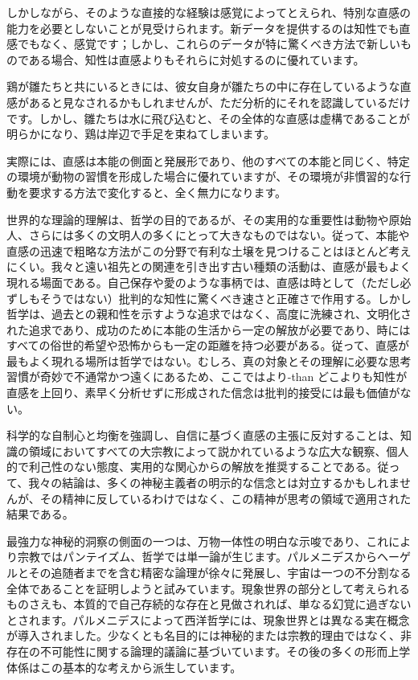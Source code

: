\documentclass[a4paper,11pt,openany]{ltjsbook}
\begin{document}
しかしながら、そのような直接的な経験は感覚によってとえられ、特別な直感の能力を必要としないことが見受けられます。新データを提供するのは知性でも直感でもなく、感覚です；しかし、これらのデータが特に驚くべき方法で新しいものである場合、知性は直感よりもそれらに対処するのに優れています。

鶏が雛たちと共にいるときには、彼女自身が雛たちの中に存在しているような直感があると見なされるかもしれませんが、ただ分析的にそれを認識しているだけです。しかし、雛たちは水に飛び込むと、その全体的な直感は虚構であることが明らかになり、鶏は岸辺で手足を束ねてしまいます。

実際には、直感は本能の側面と発展形であり、他のすべての本能と同じく、特定の環境が動物の習慣を形成した場合に優れていますが、その環境が非慣習的な行動を要求する方法で変化すると、全く無力になります。

世界的な理論的理解は、哲学の目的であるが、その実用的な重要性は動物や原始人、さらには多くの文明人の多くにとって大きなものではない。従って、本能や直感の迅速で粗略な方法がこの分野で有利な土壌を見つけることはほとんど考えにくい。我々と遠い祖先との関連を引き出す古い種類の活動は、直感が最もよく現れる場面である。自己保存や愛のような事柄では、直感は時として（ただし必ずしもそうではない）批判的な知性に驚くべき速さと正確さで作用する。しかし哲学は、過去との親和性を示すような追求ではなく、高度に洗練され、文明化された追求であり、成功のために本能の生活から一定の解放が必要であり、時にはすべての俗世的希望や恐怖からも一定の距離を持つ必要がある。従って、直感が最もよく現れる場所は哲学ではない。むしろ、真の対象とその理解に必要な思考習慣が奇妙で不通常かつ遠くにあるため、ここではより-than どこよりも知性が直感を上回り、素早く分析せずに形成された信念は批判的接受には最も価値がない。

科学的な自制心と均衡を強調し、自信に基づく直感の主張に反対することは、知識の領域においてすべての大宗教によって説かれているような広大な観察、個人的で利己性のない態度、実用的な関心からの解放を推奨することである。従って、我々の結論は、多くの神秘主義者の明示的な信念とは対立するかもしれませんが、その精神に反しているわけではなく、この精神が思考の領域で適用された結果である。


最強力な神秘的洞察の側面の一つは、万物一体性の明白な示唆であり、これにより宗教ではパンテイズム、哲学では単一論が生じます。パルメニデスからヘーゲルとその追随者までを含む精密な論理が徐々に発展し、宇宙は一つの不分割なる全体であることを証明しようと試みています。現象世界の部分として考えられるものさえも、本質的で自己存続的な存在と見做されれば、単なる幻覚に過ぎないとされます。パルメニデスによって西洋哲学には、現象世界とは異なる実在概念が導入されました。少なくとも名目的には神秘的または宗教的理由ではなく、非存在の不可能性に関する論理的議論に基づいています。その後の多くの形而上学体係はこの基本的な考えから派生しています。
\end{document}
